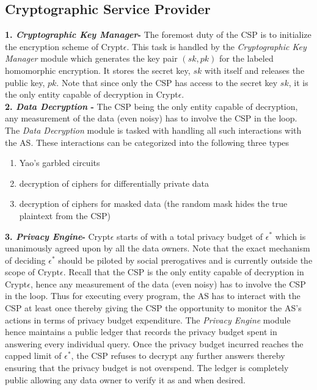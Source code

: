 \subsection*{Cryptographic Service Provider}
\textbf{1. \textit{ Cryptographic Key Manager}-} The foremost duty of the \textsf{CSP} is to initialize the encryption scheme of Crypt$\epsilon$. This task is handled by the \textit{Cryptographic Key Manager} module which generates the key pair $(sk,pk)$ for the labeled homomorphic encryption. It stores the secret key, $sk$ with itself and releases the public key, $pk$. Note that since only the \textsf{CSP} has access to the secret key $sk$, it is the only entity capable of decryption in Crypt$\epsilon$.\\\textbf{2. \textit{ Data Decryption} - } The \textsf{CSP} being the only entity capable of decryption,  any measurement of the data (even noisy) has to involve the \textsf{CSP} in the loop. The \textit{Data Decryption} module is tasked with handling all such interactions with the \textsf{AS}. These interactions can be categorized into the following three types  \begin{enumerate}\item Yao's garbled circuits \item decryption of ciphers for differentially private data \item decryption of ciphers for masked data (the random mask hides the true plaintext from the \textsf{CSP}) \end{enumerate}
\textbf{3. \textit{ Privacy Engine}-} Crypt$\epsilon$ starts of with a total privacy budget of $\epsilon^*$ which is unanimously agreed upon by all the data owners. Note that the exact mechanism of deciding $\epsilon^*$ should be piloted by social prerogatives and is currently outside the scope of Crypt$\epsilon$. Recall that the CSP is the only entity capable of decryption in Crypt$\epsilon$, hence any measurement of the data (even noisy) has to involve the \textsf{CSP} in the loop.  Thus for executing every program, the \textsf{AS} has to interact with the \textsf{CSP} at least once thereby giving the \textsf{CSP} the opportunity to monitor the \textsf{AS}'s actions in terms of privacy budget expenditure. The \textit{Privacy Engine} module hence maintains a public ledger that records the privacy budget spent in answering every individual query. Once the privacy budget incurred reaches the capped limit of $\epsilon^*$, the \textsf{CSP} refuses to decrypt any further answers thereby ensuring that the privacy budget is not overspend.  The ledger is completely public allowing any data owner to verify it as and when desired.
